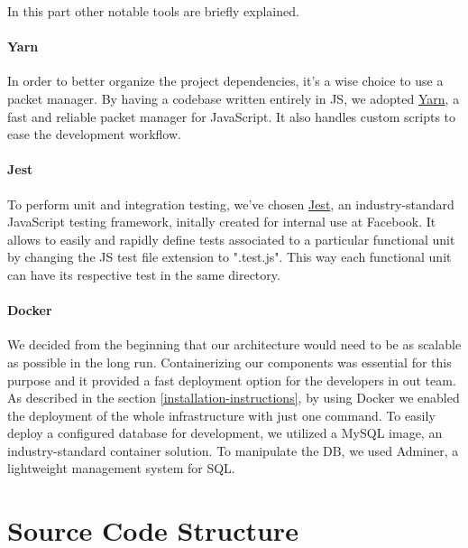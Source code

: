 \documentclass[
]{article}
\begin{document}
In this part other notable tools are briefly explained.

\hypertarget{yarn}{%
\paragraph{Yarn}\label{yarn}}

In order to better organize the project dependencies, it's a wise choice
to use a packet manager. By having a codebase written entirely in JS, we
adopted \href{https://yarnpkg.com/}{Yarn}, a fast and reliable packet
manager for JavaScript. It also handles custom scripts to ease the
development workflow.

\hypertarget{jest}{%
\paragraph{Jest}\label{jest}}

To perform unit and integration testing, we've chosen
\href{https://jestjs.io/}{Jest}, an industry-standard JavaScript testing
framework, initally created for internal use at Facebook. It allows to easily and rapidly define tests associated to a particular functional unit by changing the JS test file extension to ".test.js". This way each functional unit can have its respective test in the same directory.

\hypertarget{docker}{%
\paragraph{Docker}\label{docker}}
We decided from the beginning that our architecture would need to be as scalable as possible in the long run.
Containerizing our components was essential for this purpose and it provided a fast deployment option for the developers in out team. 
As described in the section \ref{installation-instructions}, by using Docker we enabled the deployment of the whole infrastructure with just one command.
To easily deploy a configured database for development, we utilized a MySQL image, an industry-standard container solution.
To manipulate the DB, we used Adminer, a lightweight management system for SQL.

\hypertarget{source-code-structure}{%
\section{Source Code Structure}\label{source-code-structure}}
\end{document}
